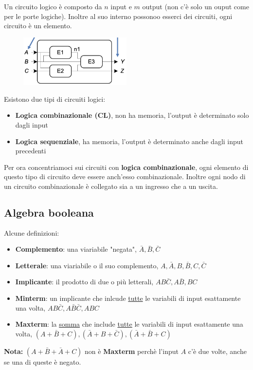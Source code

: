 \documentclass[../main.tex]{subfiles}
\begin{document}
Un circuito logico è composto da $n$ input e $m$ output (non c'è solo un ouput come per le porte logiche). Inoltre al suo interno
possonoo esserci dei circuiti, ogni circuito è un elemento.
\begin{figure}[h]
    \centering
    \includegraphics[width=0.5\textwidth]{images/circuitoLogico.png}
\end{figure}

Esistono due tipi di circuiti logici:
\begin{itemize}
    \item \textbf{Logica combinazionale (CL)}, non ha memoria, l'output è determinato solo dagli input
    \item \textbf{Logica sequenziale}, ha memoria, l'output è determinato anche dagli input precedenti
\end{itemize}

Per ora concentriamoci sui circuiti con \textbf{logica combinazionale}, ogni elemento di questo tipo di circuito deve essere
anch'esso combinazionale. Inoltre ogni nodo di un circuito combinazionale è collegato sia a un ingresso che a un uscita.

\subsection{Algebra booleana}
Alcune definizioni:
\begin{itemize}
    \item \textbf{Complemento}: una viariabile "negata", $\bar{A}, \bar{B}, \bar{C}$
    \item \textbf{Letterale}: una viariabile o il suo complemento, $A, \bar{A}, B, \bar{B}, C, \bar{C}$
    \item \textbf{Implicante}: il prodotto di due o più letterali, $AB\bar{C}, A\bar{B}, BC$
    \item \textbf{Minterm}: un implicante che inlcude \underline{tutte} le variabili di input esattamente una volta, $AB\bar{C}, A\bar{B}\bar{C}, ABC$
    \item \textbf{Maxterm}: la \underline{somma} che include \underline{tutte} le variabili di input esattamente una volta, $(A+\bar{B}+C), (\bar{A}+B+\bar{C}), (\bar{A}+\bar{B}+C)$
\end{itemize}
\textbf{Nota:} $(A+\bar{B}+\bar{A}+C)$ non è \textbf{Maxterm} perchè l'input $A$ c'è due volte, anche se una di queste è negato.
\end{document}
